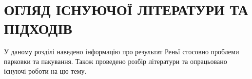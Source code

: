 \chapter{ОГЛЯД ІСНУЮЧОЇ ЛІТЕРАТУРИ ТА ПІДХОДІВ} 

У даному розділі наведено інформацію про результат Реньї стосовно проблеми парковки та пакування. Також проведено розбір літератури та опрацьовано існуючі роботи на цю тему.



%
%

	
